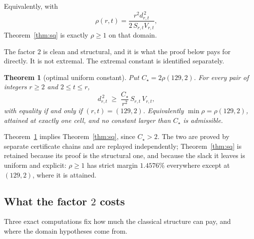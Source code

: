 \documentclass[11pt,a4paper]{article}
\theoremstyle{plain}
\newtheorem{theorem}{Theorem}[section]
\theoremstyle{definition}
\theoremstyle{remark}
\begin{document}
Equivalently, with
\begin{equation}\label{eq:rho}
  \rho(r,t)=\frac{r^2 d_{r,t}^{\,2}}{2\,S_{r,t}V_{r,t}},
\end{equation}
Theorem~\ref{thm:sq} is exactly $\rho\ge1$ on that domain.

The factor $2$ is clean and structural, and it is what the proof below pays for
directly. It is not extremal. The extremal constant is identified separately.

\begin{theorem}[optimal uniform constant]\label{thm:sharp}
Put $C_\star=2\rho(129,2)$. For every pair of integers $r\ge2$ and
$2\le t\le r$,
\[
  d_{r,t}^{\,2}\;\ge\;\frac{C_\star}{r^2}\,S_{r,t}\,V_{r,t},
\]
with equality if and only if $(r,t)=(129,2)$. Equivalently
$\min\rho=\rho(129,2)$, attained at exactly one cell, and no constant larger
than $C_\star$ is admissible.
\end{theorem}

Theorem~\ref{thm:sharp} implies Theorem~\ref{thm:sq}, since
$C_\star>2$. The two are proved by separate certificate chains and are
replayed independently; Theorem~\ref{thm:sq} is retained because its proof is
the structural one, and because the slack it leaves is uniform and explicit:
$\rho\ge1$ has strict margin $1.4576\%$ everywhere except at $(129,2)$, where
it is attained.

\subsection{What the factor \texorpdfstring{$2$}{2} costs}

Three exact computations fix how much the classical structure can pay, and where
the domain hypotheses come from.
\end{document}
